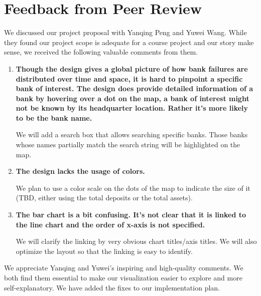 \section{Feedback from Peer Review}
We discussed our project proposal with Yanqing Peng and Yuwei Wang. While they
found our project scope is adequate for a course project and our story make
sense, we received the following valuable comments from them.

\begin{enumerate}[1.]
    \item {\bfseries
        Though the design gives a global picture of how bank failures are
        distributed over time and space, it is hard to pinpoint a specific
        bank of interest. The design does provide detailed information of a
        bank by hovering over a dot on the map, a bank of interest might not
        be known by its headquarter location. Rather it's more likely to be
        the bank name.}

    We will add a search box that allows searching specific banks. Those banks
    whose names partially match the search string will be highlighted on the
    map.

    \item {\bfseries
        The design lacks the usage of colors.
    }

    We plan to use a color scale on the dots of the map to indicate the size
    of it (TBD, either using the total deposits or the total assets).

    \item {\bfseries
        The bar chart is a bit confusing. It's not clear that it is linked to
        the line chart and the order of x-axis is not specified.
    }

    We will clarify the linking by very obvious chart titles/axis titles. We
    will also optimize the layout so that the linking is easy to identify.
\end{enumerate}

We appreciate Yanqing and Yuwei's inspiring and high-quality comments. We
both find them essential to make our visualization easier to explore and more
self-explanatory. We have added the fixes to our implementation plan.

